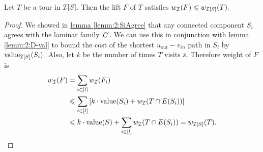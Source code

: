 \documentclass[./main.tex]{subfiles}
\begin{document}
	\begin{lemma}\label{lemm:3:lift-i}
		Let $T$ be a tour in $\mathcal{I}[S]$. Then the lift $F$ of $T$ satisfies $w_{\mathcal{I}}(F) \leqslant w_{\mathcal{I}[S]}(T).$
	\end{lemma}
	\begin{proof}
		We showed in \hyperref[lemm:2:SiAgree]{lemma \ref{lemm:2:SiAgree}} that any connected component $S_i$ agrees with the laminar family $\mathcal{L}'$. We can use this in conjunction with \hyperref[lemm:2:D-val]{lemma \ref{lemm:2:D-val}} to bound the cost of the shortest $u_{out} - v_{in}$ path in $S_i$ by $\textup{value}_{\mathcal{I}[S]}(S_i)$. Also, let $k$ be the number of times $T$ visits $\bar{s}$. Therefore weight of $F$ is
		\begin{align*}
			w_{\mathcal{I}}(F) &= \sum_{i \in [l]} w_{\mathcal{I}}(F_i)\\
			&\leqslant \sum_{i \in [l]} \left[k\cdot\textup{value}(S_i) + w_{\mathcal{I}}(T \cap E(S_i))\right]\\
			&\leqslant k \cdot\textup{value}(S) + \sum_{i \in [l]}w_{\mathcal{I}}(T \cap E(S_i)) = w_{\mathcal{I}[S]}(T).
		\end{align*}
	\end{proof}
\end{document}

